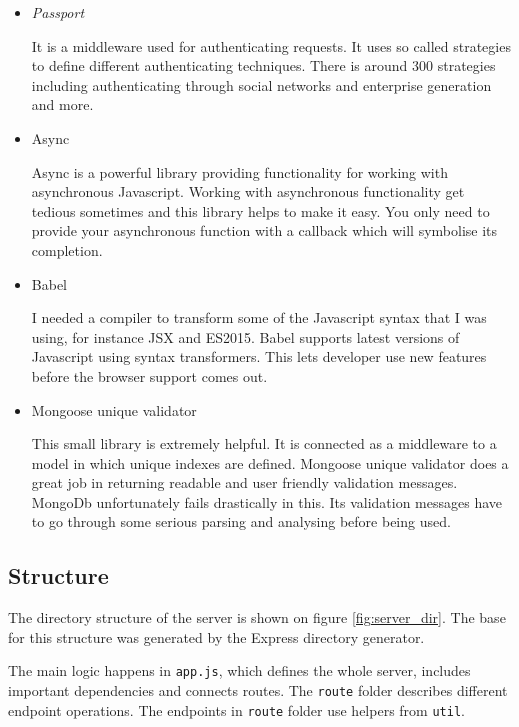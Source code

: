 \documentclass[thesis=M,english]{FITthesis}[2012/10/20]
\begin{document}
\begin{itemize}
	\item \textit{Passport} 
	
	It is a middleware used for authenticating requests. It uses so called strategies to define different authenticating techniques. There is around 300 strategies including authenticating through social networks and enterprise generation and more. \cite{pass}
	\item {Async}
	
	Async is a powerful library providing functionality for working with asynchronous Javascript. Working with asynchronous functionality get tedious sometimes and this library helps to make it easy. You only need to provide your asynchronous function with a callback which will symbolise its completion.\cite{sync}
	
	\item {Babel}
	
	I needed a compiler to transform some of the Javascript syntax that I was using, for instance JSX  and ES2015. Babel supports latest versions of Javascript using syntax transformers. This lets developer use new features before the browser support comes out. \cite{babel}
	
	\item{Mongoose unique validator}
	
	This small library is extremely helpful. It is connected as a middleware to a model in which unique indexes are defined. Mongoose unique validator does a great job in returning readable and user friendly validation messages. MongoDb unfortunately fails drastically in this. Its validation messages have to go through some serious parsing and analysing before being used. \cite{mvalid}
\end{itemize}

\subsection{Structure}

The directory structure of the server is shown on figure \ref{fig:server_dir}. The base for this structure was generated by the Express directory generator. 

The main logic happens in \verb|app.js|, which defines the whole server, includes important dependencies and connects routes.
The \verb|route| folder describes different endpoint operations. The endpoints in \verb|route| folder use helpers from \verb|util|. 
\end{document}
